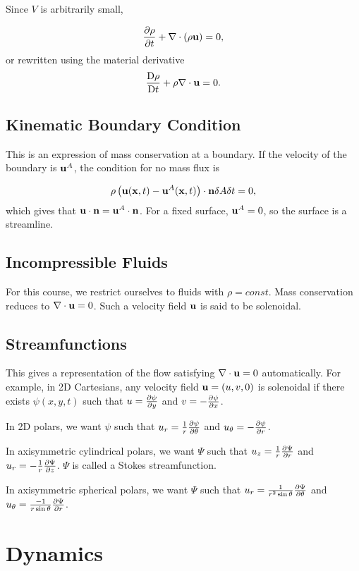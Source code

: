 \documentclass{notes}
\newcommand{\matd}[1]{\DDt{#1}}
\newcommand{\divr}{\nabla\cdot}
\begin{document}
Since $V$ is arbitrarily small,

\[
\pd{\rho}{t} + \divr{(\rho \vu)} = 0,
\]
or rewritten using the material derivative
\[
\matd{\rho} + \rho \divr{\vu} = 0.
\]

\section{Kinematic Boundary Condition}

This is an expression of mass conservation at a boundary.  If the
velocity of the boundary is $\mathbf{u}^A$, the condition for no mass flux is

\[
\rho \left( \mathbf{u}(\mathbf{x},t) - \mathbf{u}^A(\mathbf{x},t) \right)\cdot\mathbf{n} \delta A \delta t =
0,
\]
which gives that $\mathbf{u}\cdot\mathbf{n} = \mathbf{u}^A\cdot\mathbf{n}$.  For a fixed surface,
$\mathbf{u}^A = 0$, so the surface is a streamline.

\section{Incompressible Fluids}

For this course, we restrict ourselves to fluids with $\rho = const$.
Mass conservation reduces to $\divr{\vu} = 0$.  Such a velocity field
$\mathbf{u}$ is said to be solenoidal.

\section{Streamfunctions}

This gives a representation of the flow satisfying $\divr{\vu}=0$
automatically.  For example, in 2D Cartesians, any velocity field
$\mathbf{u}=(u,v,0)$ is solenoidal if there exists $\psi(x,y,t)$ such that $u
= \frac{\partial \psi}{\partial y}$ and $v = -\frac{\partial \psi}{\partial x}$.

In 2D polars, we want $\psi$ such that $u_r =
\frac{1}{r}\frac{\partial \psi}{\partial \theta}$ and $u_{\theta} = - \frac{\partial \psi}{\partial r}$.

In axisymmetric cylindrical polars, we want $\Psi$ such that $u_z =
\frac{1}{r} \frac{\partial \Psi}{\partial r}$ and $u_r = -\frac{1}{r}\frac{\partial \Psi}{\partial z}$.
$\Psi$ is called a Stokes streamfunction.

In axisymmetric spherical polars, we want $\Psi$ such that $u_r =
\frac{1}{r^2 \sin \theta}\frac{\partial \Psi}{\partial \theta}$ and $u_{\theta} =
\frac{-1}{r \sin \theta} \frac{\partial \Psi}{\partial r}$.

\chapter{Dynamics}
\end{document}

